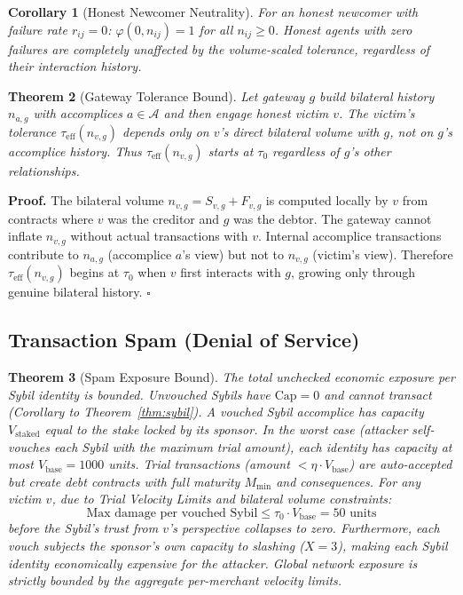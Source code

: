 \documentclass[11pt]{article}
\newtheorem{theorem}{Theorem}[section]
\newtheorem{corollary}[theorem]{Corollary}
\newcommand{\qed}{\hfill}
\newenvironment{proof}{\noindent\textbf{Proof.}}{\qed$\square$\par\medskip}
\begin{document}
\begin{corollary}[Honest Newcomer Neutrality]
For an honest newcomer with failure rate $r_{ij} = 0$: $\varphi(0, n_{ij}) = 1$ for all $n_{ij} \geq 0$. Honest agents with zero failures are \emph{completely unaffected} by the volume-scaled tolerance, regardless of their interaction history.
\end{corollary}

\begin{theorem}[Gateway Tolerance Bound]\label{thm:gateway_tolerance}
Let gateway $g$ build bilateral history $n_{a,g}$ with accomplices $a \in \mathcal{A}$ and then engage honest victim $v$. The victim's tolerance $\tau_{\text{eff}}(n_{v,g})$ depends \emph{only} on $v$'s direct bilateral volume with $g$, not on $g$'s accomplice history. Thus $\tau_{\text{eff}}(n_{v,g})$ starts at $\tau_0$ regardless of $g$'s other relationships.
\end{theorem}

\begin{proof}
The bilateral volume $n_{v,g} = S_{v,g} + F_{v,g}$ is computed locally by $v$ from contracts where $v$ was the creditor and $g$ was the debtor. The gateway cannot inflate $n_{v,g}$ without actual transactions with $v$. Internal accomplice transactions contribute to $n_{a,g}$ (accomplice $a$'s view) but not to $n_{v,g}$ (victim's view). Therefore $\tau_{\text{eff}}(n_{v,g})$ begins at $\tau_0$ when $v$ first interacts with $g$, growing only through genuine bilateral history. \qed
\end{proof}

\subsection{Transaction Spam (Denial of Service)}

\begin{theorem}[Spam Exposure Bound]\label{thm:spam}
The total unchecked economic exposure per Sybil identity is bounded. Unvouched Sybils have $\text{Cap} = 0$ and cannot transact (Corollary to Theorem~\ref{thm:sybil}). A vouched Sybil accomplice has capacity $V_{\text{staked}}$ equal to the stake locked by its sponsor. In the worst case (attacker self-vouches each Sybil with the maximum trial amount), each identity has capacity at most $V_{\text{base}} = 1000$ units. Trial transactions (amount $< \eta \cdot V_{\text{base}}$) are auto-accepted but create debt contracts with full maturity $M_{\min}$ and consequences. For any victim $v$, due to Trial Velocity Limits and bilateral volume constraints:
\begin{equation}
    \text{Max damage per vouched Sybil} \leq \tau_0 \cdot V_{\text{base}} = 50 \text{ units}
\end{equation}
before the Sybil's trust from $v$'s perspective collapses to zero. Furthermore, each vouch subjects the sponsor's own capacity to slashing ($X = 3$), making each Sybil identity economically expensive for the attacker. Global network exposure is strictly bounded by the aggregate per-merchant velocity limits.
\end{theorem}
\end{document}
